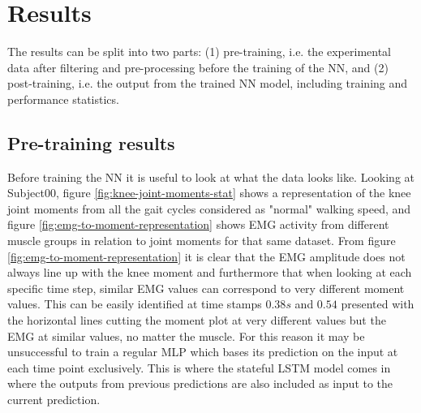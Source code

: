\documentclass[../main.tex]{subfiles}
\begin{document}
\chapter{Results}
The results can be split into two parts: (1) pre-training, i.e. the experimental data after filtering and pre-processing before the training of the \ac{NN}, and (2) post-training, i.e. the output from the trained \ac{NN} model, including training and performance statistics.

\section{Pre-training results}
Before training the \ac{NN} it is useful to look at what the data looks like.
Looking at Subject00, figure \ref{fig:knee-joint-moments-stat} shows a representation of the knee joint moments from all the gait cycles considered as "normal" walking speed, and figure \ref{fig:emg-to-moment-representation} shows \ac{EMG} activity from different muscle groups in relation to joint moments for that same dataset.
From figure \ref{fig:emg-to-moment-representation} it is clear that the \ac{EMG} amplitude does not always line up with the knee moment and furthermore that when looking at each specific time step, similar \ac{EMG} values can correspond to very different moment values. 
This can be easily identified at time stamps $0.38s$ and $0.54$ presented with the horizontal lines cutting the moment plot at very different values but the \ac{EMG} at similar values, no matter the muscle.
For this reason it may be unsuccessful to train a regular \ac{MLP} which bases its prediction on the input at each time point exclusively. 
This is where the stateful \ac{LSTM} model comes in where the outputs from previous predictions are also included as input to the current prediction. 
\end{document}
